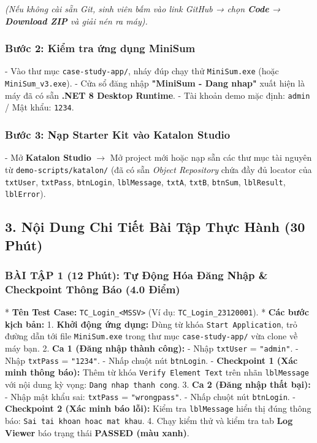 \textit{(Nếu không cài sẵn Git, sinh viên bấm vào link GitHub → chọn \textbf{Code} → \textbf{Download ZIP} và giải nén ra máy).}

\subsubsection{Bước 2: Kiểm tra ứng dụng MiniSum}
- Vào thư mục \texttt{case-study-app/}, nháy đúp chạy thử \texttt{MiniSum.exe} (hoặc \texttt{MiniSum_v3.exe}).
- Cửa sổ đăng nhập \textbf{"MiniSum - Dang nhap"} xuất hiện là máy đã có sẵn \textbf{.NET 8 Desktop Runtime}.
- Tài khoản demo mặc định: \texttt{admin} / Mật khẩu: \texttt{1234}.

\subsubsection{Bước 3: Nạp Starter Kit vào Katalon Studio}
- Mở \textbf{Katalon Studio} $\to$ Mở project mới hoặc nạp sẵn các thư mục tài nguyên từ \texttt{demo-scripts/katalon/} (đã có sẵn \textit{Object Repository} chứa đầy đủ locator của \texttt{txtUser}, \texttt{txtPass}, \texttt{btnLogin}, \texttt{lblMessage}, \texttt{txtA}, \texttt{txtB}, \texttt{btnSum}, \texttt{lblResult}, \texttt{lblError}).


\subsection{3. Nội Dung Chi Tiết Bài Tập Thực Hành (30 Phút)}

\subsubsection{BÀI TẬP 1 (12 Phút): Tự Động Hóa Đăng Nhập \& Checkpoint Thông Báo (4.0 Điểm)}

* \textbf{Tên Test Case:} \texttt{TC_Login_<MSSV>} (Ví dụ: \texttt{TC_Login_23120001}).
* \textbf{Các bước kịch bản:}
  1. \textbf{Khởi động ứng dụng:} Dùng từ khóa \texttt{Start Application}, trỏ đường dẫn tới file \texttt{MiniSum.exe} trong thư mục \texttt{case-study-app/} vừa clone về máy bạn.
  2. \textbf{Ca 1 (Đăng nhập thành công):}
     - Nhập \texttt{txtUser} = \texttt{"admin"}.
     - Nhập \texttt{txtPass} = \texttt{"1234"}.
     - Nhấp chuột nút \texttt{btnLogin}.
     - \textbf{Checkpoint 1 (Xác minh thông báo):} Thêm từ khóa \texttt{Verify Element Text} trên nhãn \texttt{lblMessage} với nội dung kỳ vọng: \texttt{Dang nhap thanh cong}.
  3. \textbf{Ca 2 (Đăng nhập thất bại):}
     - Nhập mật khẩu sai: \texttt{txtPass} = \texttt{"wrongpass"}.
     - Nhấp chuột nút \texttt{btnLogin}.
     - \textbf{Checkpoint 2 (Xác minh báo lỗi):} Kiểm tra \texttt{lblMessage} hiển thị đúng thông báo: \texttt{Sai tai khoan hoac mat khau}.
  4. Chạy kiểm thử và kiểm tra tab \textbf{Log Viewer} báo trạng thái \textbf{PASSED (màu xanh)}.


